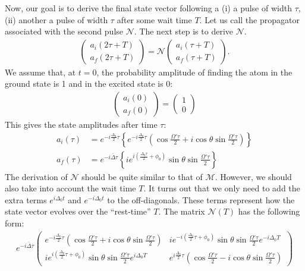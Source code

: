 \documentclass{article}
\begin{document}
Now, our goal is to derive the final state vector following a (i) a pulse of width $\tau$, (ii) another a pulse of width $\tau$ after some wait time $T$. Let us call the propagator associated with the second pulse $\mathcal{N}$. The next step is to derive $\mathcal{N}$.
\begin{align}
\begin{pmatrix}
a_i(2\tau + T)\\a_f(2\tau + T)
\end{pmatrix}=
\mathcal{N}\begin{pmatrix}
a_i(\tau + T)\\a_f(\tau + T)
\end{pmatrix}.
\end{align}
We assume that, at $t = 0$, the probability amplitude of finding the atom in the ground state is 1 and in the excited state is 0:
\begin{align}
\boxed{\begin{pmatrix}
a_i(0) \\ a_f(0)
\end{pmatrix}
= \begin{pmatrix}
1 \\ 0
\end{pmatrix}}
\end{align}
This gives the state amplitudes after time $\tau$:
\begin{align}
a_i(\tau) &= e^{-i\frac{\Delta_0}{2}\tau}\left\{ e^{-i\frac{\Delta_0}{2}\tau}\left(\cos\frac{\Omega'\tau}{2} + i\cos\theta\sin\frac{\Omega'\tau}{2} \right) \right\}\nonumber\\
a_f(\tau) &= e^{-i\bar{\Delta}\tau}\left\{ie^{i\left(\frac{\Delta_0\tau}{2} + \phi_0 \right) }\sin\theta\sin\frac{\Omega'\tau}{2} \right\} 
\end{align}
The derivation of $\mathcal{N}$ should be quite similar to that of $\mathcal{M}$. However, we should also take into account the wait time $T$. It turns out that we only need to add the extra terms $e^{i\Delta_0t}$ and $e^{-i\Delta_0t}$ to the off-diagonals. These terms represent how the state vector evolves over the ``rest-time'' $T$. The matrix $\mathcal{N}(T)$ has the following form:
\begin{align}
\boxed{e^{-i\bar{\Delta}\tau}\begin{pmatrix}
	e^{-i\frac{\Delta_0}{2}\tau}\left(\cos\frac{\Omega'\tau}{2} + i\cos\theta\sin\frac{\Omega'\tau}{2} \right) & ie^{-i\left( \frac{\Delta_0}{2}\tau + \phi_0\right) }\sin\theta\sin\frac{\Omega'\tau}{2}e^{-i\Delta_0T}\\
	ie^{i\left( \frac{\Delta_0}{2}\tau + \phi_0\right) }\sin\theta\sin\frac{\Omega'\tau}{2}e^{i\Delta_0T} & e^{i\frac{\Delta_0}{2}\tau}\left(\cos\frac{\Omega'\tau}{2}-i\cos\theta\sin\frac{\Omega'\tau}{2} \right)
	\end{pmatrix}}
\end{align}
\end{document}
